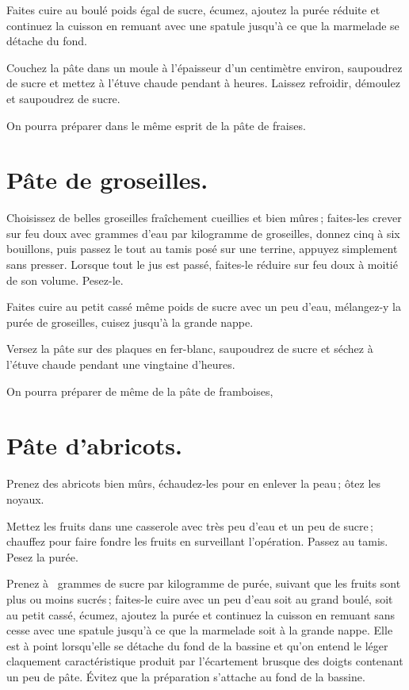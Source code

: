 Faites cuire au boulé poids égal de sucre, écumez, ajoutez la purée réduite et
continuez la cuisson en remuant avec une spatule jusqu'à ce que la marmelade se
détache du fond.

Couchez la pâte dans un moule à l'épaisseur d'un centimètre environ, saupoudrez
de sucre et mettez à l’étuve chaude pendant {\mmm} à {\mmm} heures.
Laissez refroidir, démoulez et saupoudrez de sucre.

\sk

On pourra préparer dans le même esprit de la pâte de fraises.

\section*{\centering Pâte de groseilles.}
{}

Choisissez de belles groseilles fraîchement cueillies et bien mûres ;
faites-les crever sur feu doux avec {\mmm} grammes d'eau par kilogramme
de groseilles, donnez cinq à six bouillons, puis passez le tout au tamis posé
sur une terrine, appuyez simplement sans presser. Lorsque tout le jus est
passé, faites-le réduire sur feu doux à moitié de son volume. Pesez-le.

Faites cuire au petit cassé même poids de sucre avec un peu d'eau, mélangez‑y
la purée de groseilles, cuisez jusqu'à la grande nappe.

Versez la pâte sur des plaques en fer-blanc, saupoudrez de sucre et séchez à
l'étuve chaude pendant une vingtaine d'heures.

\sk

On pourra préparer de même de la pâte de framboises,

\section*{\centering Pâte d'abricots.}
{}

Prenez des abricots bien mûrs, échaudez-les pour en enlever la peau ; ôtez les
noyaux.

Mettez les fruits dans une casserole avec très peu d'eau et un peu de sucre ;
chauffez pour faire fondre les fruits en surveillant l'opération. Passez au
tamis. Pesez la purée.

Prenez {\mmm} à {\mmm} {\mmm} grammes de sucre par
kilogramme de purée, suivant que les fruits sont plus ou moins sucrés ;
faites-le cuire avec un peu d'eau soit au grand boulé, soit au petit cassé,
écumez, ajoutez la purée et continuez la cuisson en remuant sans cesse avec une
spatule jusqu'à ce que la marmelade soit à la grande nappe. Elle est à point
lorsqu'elle se détache du fond de la bassine et qu'on entend le léger
claquement caractéristique produit par l'écartement brusque des doigts
contenant un peu de pâte. Évitez que la préparation s'attache au fond de la
bassine.

